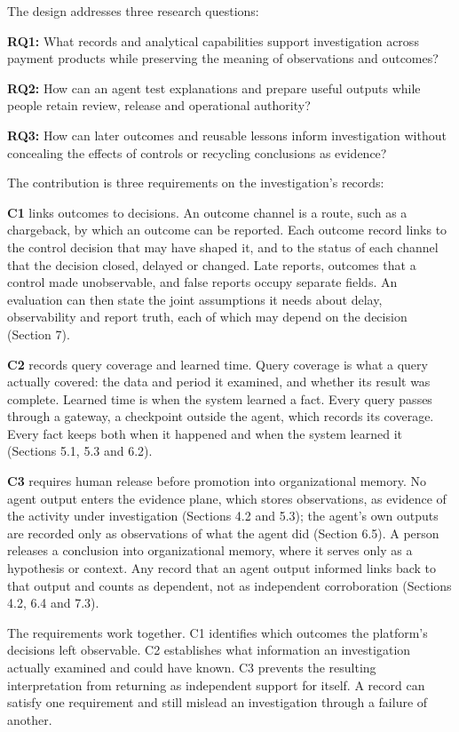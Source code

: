 \documentclass[
  11pt,
]{article}
\begin{document}
The design addresses three research questions:

\textbf{RQ1:} What records and analytical capabilities support
investigation across payment products while preserving the meaning of
observations and outcomes?

\textbf{RQ2:} How can an agent test explanations and prepare useful
outputs while people retain review, release and operational authority?

\textbf{RQ3:} How can later outcomes and reusable lessons inform
investigation without concealing the effects of controls or recycling
conclusions as evidence?

The contribution is three requirements on the investigation's records:

\textbf{C1} links outcomes to decisions. An outcome channel is a route,
such as a chargeback, by which an outcome can be reported. Each outcome
record links to the control decision that may have shaped it, and to the
status of each channel that the decision closed, delayed or changed.
Late reports, outcomes that a control made unobservable, and false
reports occupy separate fields. An evaluation can then state the joint
assumptions it needs about delay, observability and report truth, each
of which may depend on the decision (Section 7).

\textbf{C2} records query coverage and learned time. Query coverage is
what a query actually covered: the data and period it examined, and
whether its result was complete. Learned time is when the system learned
a fact. Every query passes through a gateway, a checkpoint outside the
agent, which records its coverage. Every fact keeps both when it
happened and when the system learned it (Sections 5.1, 5.3 and 6.2).

\textbf{C3} requires human release before promotion into organizational
memory. No agent output enters the evidence plane, which stores
observations, as evidence of the activity under investigation (Sections
4.2 and 5.3); the agent's own outputs are recorded only as observations
of what the agent did (Section 6.5). A person releases a conclusion into
organizational memory, where it serves only as a hypothesis or context.
Any record that an agent output informed links back to that output and
counts as dependent, not as independent corroboration (Sections 4.2, 6.4
and 7.3).

The requirements work together. C1 identifies which outcomes the
platform's decisions left observable. C2 establishes what information an
investigation actually examined and could have known. C3 prevents the
resulting interpretation from returning as independent support for
itself. A record can satisfy one requirement and still mislead an
investigation through a failure of another.
\end{document}
